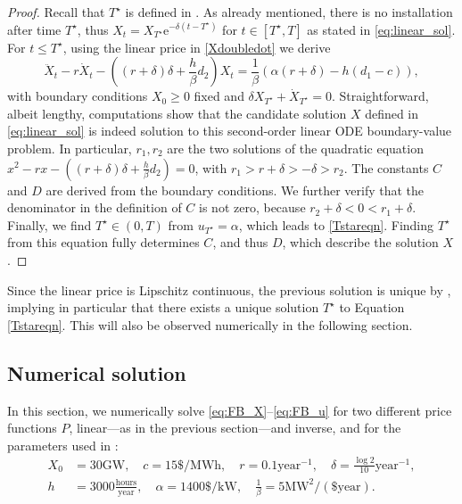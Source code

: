 \documentclass[12pt]{article}
\def\erm{\mathrm{e}}
\begin{document}
\begin{proof}
Recall that $T^\star$ is defined in . As already mentioned, there is no installation after time $T^\star$, thus $X_t=X_{T^\star } \erm^{-\delta(t-{T^\star })}$ for $t \in [T^\star,T]$ as stated in \eqref{eq:linear_sol}. For $t\leq {T^\star }$, using the linear price in \eqref{Xdoubledot} we derive
\begin{equation*}
\ddot{X}_t-r\dot{X}_t-\left((r+\delta)\delta+\frac{h}{\beta} d_2\right)X_t=
\frac{1}{\beta}\left(\alpha(r+\delta)- h(d_1-c)\right),
\end{equation*}
with boundary conditions $X_0 \geq 0$ fixed and $\delta X_{T^\star}+\dot{X}_{T^\star }=0$.
Straightforward, albeit lengthy, computations show that the candidate solution $X$ defined in \eqref{eq:linear_sol} is indeed solution to this second-order linear ODE boundary-value problem. In particular, $r_1,r_2$ are the two solutions of the quadratic equation $x^2-rx-\left((r+\delta)\delta+\frac{h}{\beta}d_2\right)=0$, with $r_1>r+\delta>-\delta>r_2$. The constants $C$ and $D$ are derived from the boundary conditions. We further verify that the denominator in the definition of $C$ is not zero, because $r_2+\delta<0<r_1+\delta$. Finally, we find ${T^\star }\in(0,T)$ from $u_{T^\star } = \alpha$, which leads to \eqref{Tstareqn}. Finding ${T^\star}$ from this equation fully determines $C$, and thus $D$, which describe the solution $X$.
\end{proof}

Since the linear price is Lipschitz continuous, the previous solution is unique by , implying in particular that there exists a unique solution $T^\star$ to Equation \eqref{Tstareqn}. This will also be observed numerically in the following section.

\subsection{Numerical solution}\label{numerics}

In this section, we numerically solve \eqref{eq:FB_X}--\eqref{eq:FB_u} for two different price functions $P$, linear---as in the previous section---and inverse, and for the parameters used in \cite{aid2020entry,alasseur2023mean}:
\begin{equation}
\begin{split}\label{eq:param_numerics}
X_0&=30\text{GW},\quad c=15\$/\text{MWh}, \quad r=0.1\text{year}^{-1},\quad
\delta=\frac{\log2}{10}\text{year}^{-1},\\
h&=3000\frac{\text{hours}}{\text{year}},\quad\alpha=1400\$/\text{kW},\quad\frac{1}{\beta}=5\text{MW}^2/(\$\text{year}). 
\end{split}
\end{equation}
\end{document}
